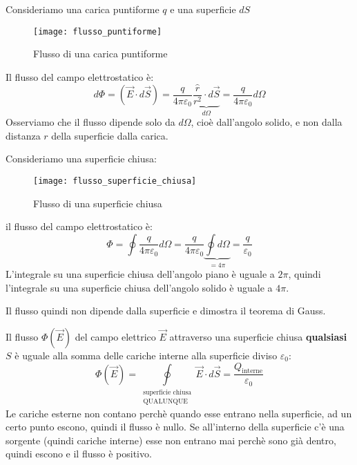 \documentclass[a4paper]{article}
\begin{document}
\begin{example}
  Consideriamo una carica puntiforme \( q \) e una superficie \( dS \) 
  \begin{figure}[H]
    \centering
    \texttt{[image: flusso\_puntiforme]}
    \caption{Flusso di una carica puntiforme}
  \end{figure}
  Il flusso del campo elettrostatico è:
  \[
    d \Phi = \left( \vec{E} \cdot d\vec{S} \right) = \frac{q}{4 \pi \varepsilon_0} 
    \underbrace{\frac{\hat{r}}{r^2} \cdot d\vec{S}}_{d \Omega} = \frac{q}{4 \pi \varepsilon_0}
    d \Omega
  \] 
  Osserviamo che il flusso dipende solo da \( d \Omega \), cioè dall'angolo solido,
  e non dalla distanza \( r \) della superficie dalla carica.
\end{example}
\begin{example}
  Consideriamo una superficie chiusa:
  \begin{figure}[H]
    \centering
    \texttt{[image: flusso\_superficie\_chiusa]}
    \caption{Flusso di una superficie chiusa}
  \end{figure}
  il flusso del campo elettrostatico è:
  \[
    \Phi = \oint \frac{q}{4 \pi \varepsilon_0} d \Omega = \frac{q}{4 \pi \varepsilon_0}
    \underbrace{\oint d \Omega}_{= 4 \pi} = \frac{q}{\varepsilon_0}
  \] 
  L'integrale su una superficie chiusa dell'angolo piano è uguale a \( 2 \pi  \),
  quindi l'integrale su una superficie chiusa dell'angolo solido è uguale a \( 4 \pi \).
\end{example}
Il flusso quindi non dipende dalla superficie e dimostra il teorema di Gauss.

\begin{theorem}
  Il flusso \( \Phi(\vec{E}) \) del campo elettrico \( \vec{E} \) attraverso una
  superficie chiusa \textbf{qualsiasi} \( S \) è uguale alla somma delle cariche interne alla superficie
  diviso \( \varepsilon_0 \):
  \[
    \Phi (\vec{E}) = \underset{\substack{\text{superficie chiusa} \\ \text{QUALUNQUE}}}{\oint} \vec{E} \cdot d \vec{S} = \frac{Q_{\text{interne}}}{\varepsilon_0}
  \] 
  Le cariche esterne non contano perchè quando esse entrano nella superficie, ad un
  certo punto escono, quindi il flusso è nullo. Se all'interno della superficie c'è
  una sorgente (quindi cariche interne) esse non entrano mai perchè sono già dentro,
  quindi escono e il flusso è positivo.
\end{theorem}
\end{document}
